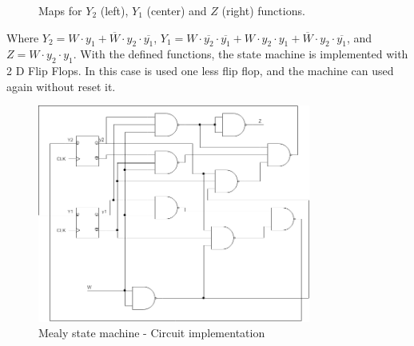\begin{figure}[H]
    \begin{center}
         \begin{Karnaughvuit}
         \end{Karnaughvuit}
         \begin{Karnaughvuit}
         \end{Karnaughvuit}
         \begin{Karnaughvuit}
         \end{Karnaughvuit}
         \caption{Maps for $Y_2$ (left), $Y_1$ (center) and $Z$ (right) functions.}
    \end{center}
    \end{figure}
Where $Y_2 = W \cdot y_1 + \overline{W} \cdot y_2 \cdot \overline{y_1}$, $Y_1 = W \cdot \overline{y_2} \cdot \overline{y_1} + W \cdot y_2 \cdot y_1 + \overline{W} \cdot y_2 \cdot \overline{y_1}$, 
and $Z = W \cdot y_2 \cdot y_1$.
With the defined functions, the state machine 
is implemented with 2 D Flip Flops. In this case
is used one less flip flop, and the machine can
used again without reset it.

\begin{figure}[H]
    \begin{centering}
    \includegraphics[width=0.8\textwidth]{data/Graficos2/2b_Compuertas_Mealy.png}
    \par\end{centering}
    \caption{Mealy state machine - Circuit implementation}
\end{figure}

